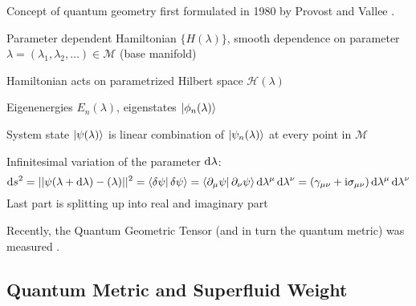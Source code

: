 \documentclass[../notes.tex]{subfiles}
\begin{document}
Concept of quantum geometry first formulated in 1980 by Provost and Vallee \cite{provostRiemannianStructureManifolds1980}.

Parameter dependent Hamiltonian \(\{H(\lambda)\}\), smooth dependence on parameter \(\lambda = (\lambda_1, \lambda_2, \ldots) \in \mathcal{M}\) (base manifold)

Hamiltonian acts on parametrized Hilbert space \(\mathcal{H} (\lambda)\)

Eigenenergies \(E_n (\lambda)\), eigenstates \(\ket{\phi_n (\lambda)}\)

System state \(\ket{\psi (\lambda)}\) is linear combination of \(\ket{\psi_n (\lambda)}\) at every point in \(\mathcal{M}\)

Infinitesimal variation of the parameter \(\odif{\lambda}\):
\begin{equation}
	\odif{s^2} = \vert\vert \psi (\lambda + \odif{\lambda}) - \si (\lambda) \vert \vert^2 = \braket{\fdif{\psi} | \fdif{\psi}} = \braket{\pdif{\mu} \psi | \pdif{\nu} \psi} \odif{\lambda^{\mu}} \odif{\lambda^{\nu}} = (\gamma_{\mu \nu} + \iu \sigma_{\mu \nu}) \odif{\lambda^{\mu}} \odif{\lambda^{\nu}}
\end{equation}
Last part is splitting up into real and imaginary part

Recently, the Quantum Geometric Tensor (and in turn the quantum metric) was measured \cite{kangMeasurementsQuantumGeometric2025}.

\subsection*{Quantum Metric and Superfluid Weight}

\end{document}
